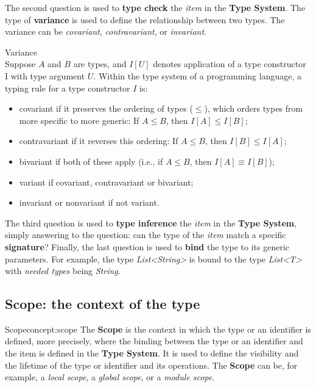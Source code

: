 The second question is used to \textbf{type check} the \textit{item} in the \textbf{Type System}. The type of \textbf{variance} is used to define the relationship between two types. The variance can be \textit{covariant}, \textit{contravariant}, or \textit{invariant}.

\begin{definition}{Variance}\\
    Suppose $A$ and $B$ are types, and $I[U]$ denotes application of a type constructor I with type argument $U$. Within the type system of a programming language, a typing rule for a type constructor $I$ is:
    \begin{itemize}
        \item covariant if it preserves the ordering of types ($\leq$), which orders types from more specific to more generic: If $A \leq B$, then $I[A] \leq I[B]$;
        \item contravariant if it reverses this ordering: If $A \leq B$, then $I[B] \leq I[A]$;
        \item bivariant if both of these apply (i.e., if $A \leq B$, then $I[A] \equiv I[B]$);
        \item variant if covariant, contravariant or bivariant;
        \item invariant or nonvariant if not variant.
    \end{itemize}
\end{definition}

The third question is used to \textbf{type inference} the \textit{item} in the \textbf{Type System}, simply answering to the question: can the type of the \textit{item} match a specific \textbf{signature}?
Finally, the last question is used to \textbf{bind} the type to its generic parameters. For example, the type \textit{List<String>} is bound to the type \textit{List<T>} with \textit{needed types} being \textit{String}.


\subsection{Scope: the context of the type}\label{subsec:concept:ScopeTheContextOfTheType}

\begin{mydefinition}{Scope}{concept:scope}
The \textbf{Scope} is the context in which the type or an identifier is defined, more precisely, where the binding between the type or an identifier and the item is defined in the \textbf{Type System}. It is used to define the visibility and the lifetime of the type or identifier and its operations. The \textbf{Scope} can be, for example, a \textit{local scope}, a \textit{global scope}, or a \textit{module scope}.
\end{mydefinition}

